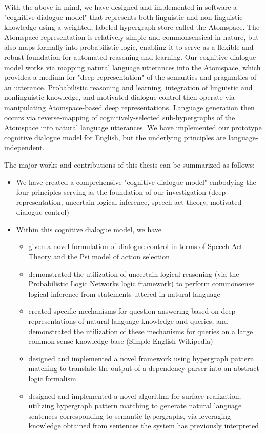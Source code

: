 \begin{englishabstract}
\begin{itemize}
With the above in mind, we have designed and implemented in software a "cognitive dialogue model" that represents both linguistic and non-linguistic knowledge using a weighted, labeled hypergraph store called the Atomspace.  The Atomspace representation is relatively simple and commonsensical in nature, but also maps formally into probabilistic logic, enabling it to serve as a flexible and robust foundation for automated reasoning and learning.  Our cognitive dialogue  model works via  mapping natural language utterances into the Atomspace, which providea a medium for "deep representation" of the semantics and pragmatics of an utterance.  Probabilistic reasoning and learning, integration of linguistic and nonlinguistic knowledge, and motivated dialogue control then operate via manipulating Atomspace-based deep representations.  Language generation then occurs via reverse-mapping of cognitively-selected sub-hypergraphs of the Atomspace into natural language utterances.  We have implemented our prototype cognitive dialogue model for English, but the underlying principles are language-independent.

The major works and contributions of this thesis can be summarized as follows:


\begin{itemize}

>>>>>>> origin/master
\item We have created a comprehensive "cognitive dialogue model" embodying the four principles serving as the foundation of our investigation (deep representation, uncertain logical inference, speech act theory, motivated dialogue control)
\item Within this cognitive dialogue model, we have
\begin{itemize}
\item given a novel formulation of dialogue control in terms of Speech Act Theory and the Psi model of action selection
\item demonstrated the utilization of uncertain logical reasoning (via the Probabilistic Logic Networks logic framework) to perform commonsense logical inference from statements uttered in natural language
\item created specific  mechanisms for question-answering based on deep representations of natural language knowledge and queries, and demonstrated the utilization of these mechanisms for queries on a large common sense knowledge base (Simple English Wikipedia)
\item designed and implemented a novel framework using hypergraph pattern matching to translate the output of a dependency parser into an abstract logic formalism
\item designed and implemented a novel algorithm for surface realization, utilizing hypergraph pattern matching to generate natural language sentences corresponding to semantic hypergraphs, via leveraging knowledge obtained from sentences the system has previously interpreted
\end{itemize}


\end{itemize}
\end{itemize}
\end{englishabstract}
